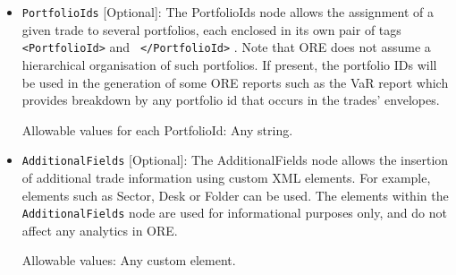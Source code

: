 \begin{itemize}
\item \lstinline!PortfolioIds! [Optional]: The PortfolioIds node
  allows the assignment of a given trade to several portfolios, each
  enclosed in its own pair of tags {\tt <PortfolioId>} and {\tt
    </PortfolioId>} . Note that ORE does not assume a hierarchical 
 organisation of such portfolios. If present, the portfolio IDs will be used in the
  generation of some ORE reports such as the VaR report which provides
  breakdown by any portfolio id that occurs in the trades' envelopes.

Allowable values for each PortfolioId: Any string.

\item \lstinline!AdditionalFields! [Optional]: The AdditionalFields node allows the insertion of additional trade
  information using custom XML elements.  For example, elements such as Sector, Desk or Folder can be used. The elements
  within the \lstinline!AdditionalFields! node are used for
  informational purposes only, and do not affect any analytics in ORE.

Allowable values: Any custom element.

\end{itemize}


